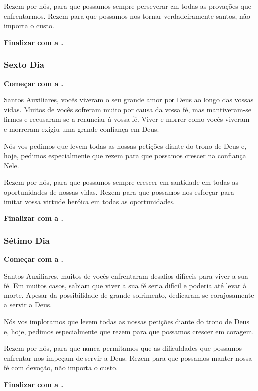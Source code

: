 \documentclass[a4paper,12pt]{extarticle} \usepackage[utf8]{inputenc}
\begin{document}
Rezem por nós, para que possamos sempre perseverar em todas as provações que enfrentarmos. Rezem para que possamos nos tornar verdadeiramente santos, não importa o custo.

\textbf{Finalizar com a .}


\subsubsection{Sexto Dia}

\textbf{Começar com a .}


Santos Auxiliares, vocês viveram o seu grande amor por Deus ao longo das vossas vidas. Muitos de vocês sofreram muito por causa da vossa fé, mas mantiveram-se firmes e recusaram-se a renunciar à vossa fé. Viver e morrer como vocês viveram e morreram exigiu uma grande confiança em Deus.

Nós vos pedimos que levem todas as nossas petições diante do trono de Deus e, hoje, pedimos especialmente que rezem para que possamos crescer na confiança Nele.

Rezem por nós, para que possamos sempre crescer em santidade em todas as oportunidades de nossas vidas. Rezem para que possamos nos esforçar para imitar vossa virtude heróica em todas as oportunidades.


\textbf{Finalizar com a .}


\subsubsection{Sétimo Dia}

\textbf{Começar com a .}



Santos Auxiliares, muitos de vocês enfrentaram desafios difíceis para viver a sua fé. Em muitos casos, sabiam que viver a sua fé seria difícil e poderia até levar à morte. Apesar da possibilidade de grande sofrimento, dedicaram-se corajosamente a servir a Deus.

Nós vos imploramos que levem todas as nossas petições diante do trono de Deus e, hoje, pedimos especialmente que rezem para que possamos crescer em coragem.

Rezem por nós, para que nunca permitamos que as dificuldades que possamos enfrentar nos impeçam de servir a Deus. Rezem para que possamos manter nossa fé com devoção, não importa o custo. 


\textbf{Finalizar com a .}
\end{document}
